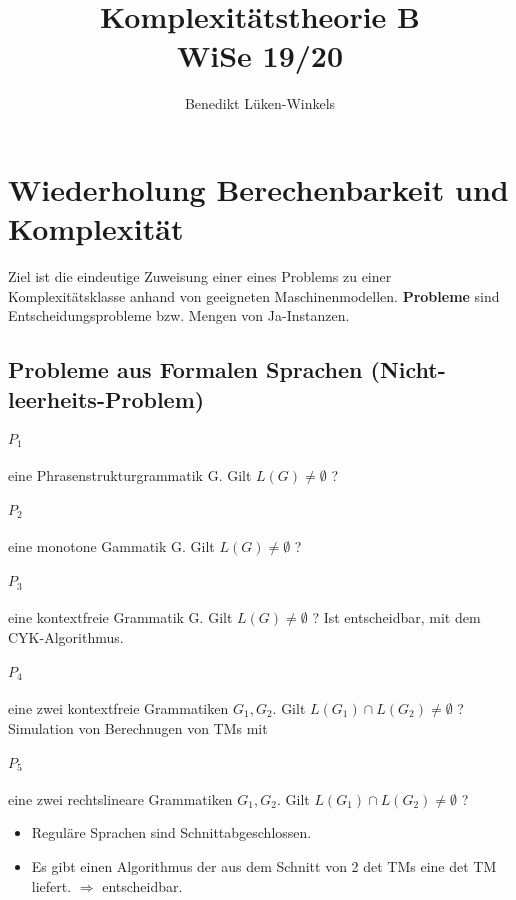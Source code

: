 \documentclass[ngerman]{scrartcl}
\title{Komplexitätstheorie B \\ WiSe 19/20}
\author{Benedikt Lüken-Winkels}
\begin{document}
\maketitle
\tableofcontents
\newpage

\section{Wiederholung Berechenbarkeit und Komplexität}
Ziel ist die eindeutige Zuweisung einer eines Problems zu einer Komplexitätsklasse anhand von geeigneten Maschinenmodellen. \textbf{Probleme} sind Entscheidungsprobleme bzw. Mengen von Ja-Instanzen. 

\subsection{Probleme aus Formalen Sprachen (Nicht-leerheits-Problem)}
\paragraph{$ P_1 $} eine Phrasenstrukturgrammatik G. Gilt $ L(G) \neq \emptyset $ ? 


\paragraph{$ P_2 $} eine monotone Gammatik G. Gilt $ L(G) \neq \emptyset $ ? 


\paragraph{$ P_3 $} eine kontextfreie Grammatik G. Gilt $ L(G) \neq \emptyset $ ? 
Ist entscheidbar, mit dem CYK-Algorithmus.

\paragraph{$ P_4 $} eine zwei kontextfreie Grammatiken $ G_1, G_2 $. Gilt $ L(G_1) \cap L(G_2) \neq \emptyset $ ? 
Simulation von Berechnugen von TMs mit 

\paragraph{$ P_5 $} eine zwei rechtslineare Grammatiken $ G_1, G_2 $. Gilt $ L(G_1) \cap L(G_2) \neq \emptyset $ ?  
\begin{itemize}
    \item Reguläre Sprachen sind Schnittabgeschlossen. 
    \item Es gibt einen Algorithmus der aus dem Schnitt von 2 det TMs eine det TM liefert. $ \Rightarrow $ entscheidbar.
\end{itemize}
\end{document}

